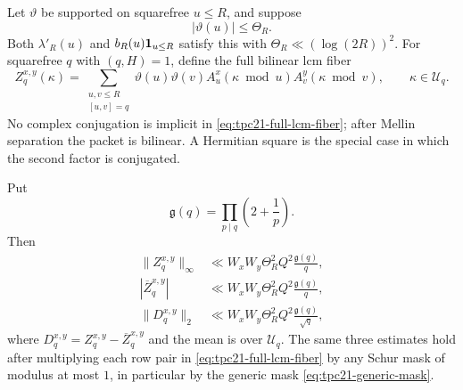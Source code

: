 Let \(\vartheta\) be supported on squarefree \(u\le R\), and suppose
\begin{equation}
 |\vartheta(u)|\le\Theta_R.
 \label{eq:tpc21-theta-size}
\end{equation}
Both \(\lambda'_R(u)\) and \(b_R(u)\mathbf 1_{u\le R}\) satisfy this with
\(\Theta_R\ll(\log(2R))^2\).  For squarefree \(q\) with \((q,H)=1\),
define the full
bilinear lcm fiber
\begin{equation}
 Z_q^{x,y}(\kappa)
 =\sum_{\substack{u,v\le R\\{}[u,v]=q}}
 \vartheta(u)\vartheta(v)
 A_u^x(\kappa\bmod u)A_v^y(\kappa\bmod v),
 \qquad \kappa\in\mathcal U_q.
 \label{eq:tpc21-full-lcm-fiber}
\end{equation}
No complex conjugation is implicit in \eqref{eq:tpc21-full-lcm-fiber};
after Mellin separation the packet is bilinear.  A Hermitian square is
the special case in which the second factor is conjugated.

\begin{theorem}
\label{thm:tpc21-occupancy-variance}
Put
\begin{equation}
 \mathfrak g(q)=\prod_{p\mid q}\left(2+\frac1p\right).
 \label{eq:tpc21-occupancy-gq}
\end{equation}
Then
\begin{align}
 \|Z_q^{x,y}\|_\infty
 &\ll W_xW_y\Theta_R^2Q^2\frac{\mathfrak g(q)}q,
 \label{eq:tpc21-fiber-linfty}\\
 |\overline Z_q^{x,y}|
 &\ll W_xW_y\Theta_R^2Q^2\frac{\mathfrak g(q)}q,
 \label{eq:tpc21-fiber-mean-bound}\\
 \|D_q^{x,y}\|_2
 &\ll W_xW_y\Theta_R^2Q^2
       \frac{\mathfrak g(q)}{\sqrt q},
 \label{eq:tpc21-fiber-discrepancy-bound}
\end{align}
where \(D_q^{x,y}=Z_q^{x,y}-\overline Z_q^{x,y}\) and the mean is over
\(\mathcal U_q\).  The same three estimates hold after multiplying
each row pair in \eqref{eq:tpc21-full-lcm-fiber} by any Schur mask of
modulus at most \(1\), in particular by the generic mask
\eqref{eq:tpc21-generic-mask}.
\end{theorem}

